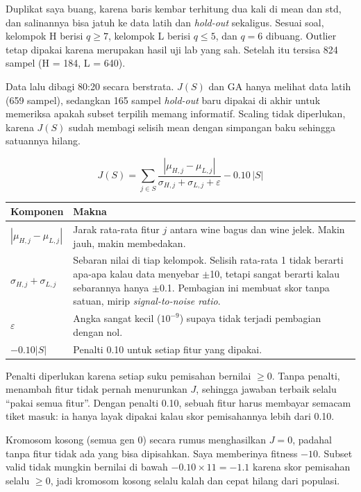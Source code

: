 Duplikat saya buang, karena baris kembar terhitung dua kali di mean dan std, dan salinannya bisa jatuh ke data latih dan \emph{hold-out} sekaligus. Sesuai soal, kelompok H berisi $q \geq 7$, kelompok L berisi $q \leq 5$, dan $q = 6$ dibuang. Outlier tetap dipakai karena merupakan hasil uji lab yang sah. Setelah itu tersisa 824 sampel (H = 184, L = 640).

Data lalu dibagi 80:20 secara berstrata. $J(S)$ dan GA hanya melihat data latih (659 sampel), sedangkan 165 sampel \emph{hold-out} baru dipakai di akhir untuk memeriksa apakah subset terpilih memang informatif. Scaling tidak diperlukan, karena $J(S)$ sudah membagi selisih mean dengan simpangan baku sehingga satuannya hilang.


\[ J(S) = \sum_{j \in S} \frac{|\mu_{H,j} - \mu_{L,j}|}{\sigma_{H,j} + \sigma_{L,j} + \varepsilon} - 0.10\,|S| \]

\begin{tabularx}{\textwidth}{@{}lL@{}}
\toprule
\textbf{Komponen} & \textbf{Makna} \\
\midrule
$|\mu_{H,j} - \mu_{L,j}|$ & Jarak rata-rata fitur $j$ antara wine bagus dan wine jelek. Makin jauh, makin membedakan. \\
$\sigma_{H,j} + \sigma_{L,j}$ & Sebaran nilai di tiap kelompok. Selisih rata-rata 1 tidak berarti apa-apa kalau data menyebar $\pm$10, tetapi sangat berarti kalau sebarannya hanya $\pm$0.1. Pembagian ini membuat skor tanpa satuan, mirip \emph{signal-to-noise ratio}. \\
$\varepsilon$ & Angka sangat kecil ($10^{-9}$) supaya tidak terjadi pembagian dengan nol. \\
$-0.10|S|$ & Penalti 0.10 untuk setiap fitur yang dipakai. \\
\bottomrule
\end{tabularx}

Penalti diperlukan karena setiap suku pemisahan bernilai $\geq 0$. Tanpa penalti, menambah fitur tidak pernah menurunkan $J$, sehingga jawaban terbaik selalu ``pakai semua fitur''. Dengan penalti 0.10, sebuah fitur harus membayar semacam tiket masuk: ia hanya layak dipakai kalau skor pemisahannya lebih dari 0.10.

Kromosom kosong (semua gen 0) secara rumus menghasilkan $J = 0$, padahal tanpa fitur tidak ada yang bisa dipisahkan. Saya memberinya fitness $-10$. Subset valid tidak mungkin bernilai di bawah $-0.10 \times 11 = -1.1$ karena skor pemisahan selalu $\geq 0$, jadi kromosom kosong selalu kalah dan cepat hilang dari populasi.

